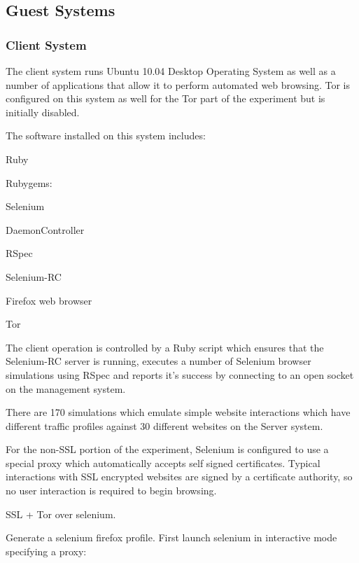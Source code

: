 \subsection{Guest Systems}

\subsubsection{Client System}

The client system runs Ubuntu 10.04 Desktop Operating System as well as a
number of applications that allow it to perform automated web browsing. Tor is
configured on this system as well for the Tor part of the experiment but is
initially disabled.

The software installed on this system includes:

\begin{itemize*}
  \item Ruby
  \item Rubygems:
    \begin{itemize*}
      \item Selenium
      \item DaemonController
      \item RSpec
    \end{itemize*}
  \item Selenium-RC
  \item Firefox web browser
  \item Tor
\end{itemize*}

The client operation is controlled by a Ruby script which ensures that the
Selenium-RC server is running, executes a number of Selenium browser
simulations using RSpec and reports it's success by connecting to an open
socket on the management system.

There are 170 simulations which emulate simple website interactions which have
different traffic profiles against 30 different websites on the Server system.

For the non-SSL portion of the experiment, Selenium is configured to use a
special proxy which automatically accepts self signed certificates. Typical
interactions with SSL encrypted websites are signed by a certificate authority,
so no user interaction is required to begin browsing.


SSL + Tor over selenium. 

Generate a selenium firefox profile. First launch selenium in interactive mode specifying a proxy:

